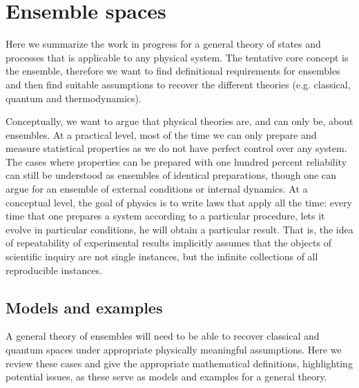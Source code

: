 
\def\>{\rangle}
\def\<{\langle}

\newcommand\mix{\mathrm{mix}}
\newcommand\component{\mathrm{comp}}
\newcommand\cospan{\mathrm{cospan}}
\newcommand\dist{\mathrm{dist}}
\newcommand\hull{\mathrm{hull}}

\newcommand\vspan{\mathrm{span}}
\newcommand\cl{\mathrm{cl}}


\newcommand{\ens}[1][e] {\mathsf{#1}} %
\newcommand{\Ens}[1][E] {\mathcal{#1}} %

\chapter{Ensemble spaces}

Here we summarize the work in progress for a general theory of states and processes that is applicable to any physical system. The tentative core concept is the ensemble, therefore we want to find definitional requirements for ensembles and then find suitable assumptions to recover the different theories (e.g. classical, quantum and thermodynamics).

 Conceptually, we want to argue that physical theories are, and can only be, about ensembles. At a practical level, most of the time we can only prepare and measure statistical properties as we do not have perfect control over any system. The cases where properties can be prepared with one hundred percent reliability can still be understood as ensembles of identical preparations, though one can argue for an ensemble of external conditions or internal dynamics. At a conceptual level, the goal of physics is to write laws that apply all the time: every time that one prepares a system according to a particular procedure, lets it evolve in particular conditions, he will obtain a particular result. That is, the idea of repeatability of experimental results implicitly assumes that the objects of scientific inquiry are not single instances, but the infinite collections of all reproducible instances.

\section{Models and examples}

A general theory of ensembles will need to be able to recover classical and quantum spaces under appropriate physically meaningful assumptions. Here we review these cases and give the appropriate mathematical definitions, highlighting potential issues, as these serve as models and examples for a general theory.

